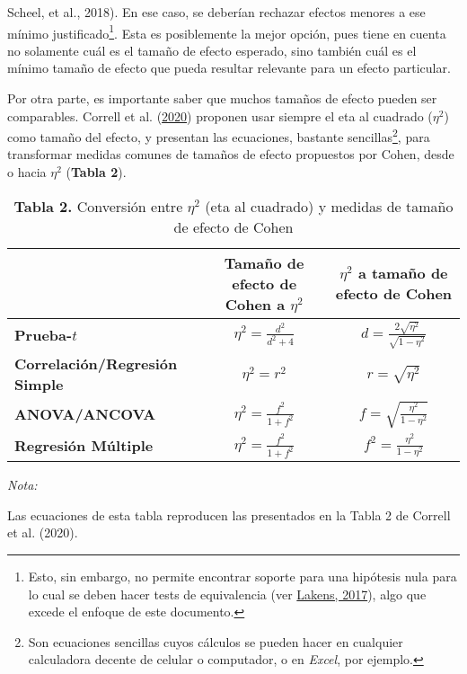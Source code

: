 \documentclass[
]{article}
\begin{document}
\begin{enumerate}
{  Scheel, et al., 2018}). En ese caso, se deberían rechazar efectos
  menores a ese mínimo justificado\footnote{Esto, sin embargo, no
    permite encontrar soporte para una hipótesis nula para lo cual se
    deben hacer tests de equivalencia (ver
    \protect\hyperlink{ref-lakensEquivalenceTestsPractical2017}{Lakens,
    2017}), algo que excede el enfoque de este documento.}.
  \newline \newline Esta es posiblemente la mejor opción, pues tiene en
  cuenta no solamente cuál es el tamaño de efecto esperado, sino también
  cuál es el mínimo tamaño de efecto que pueda resultar relevante para
  un efecto particular.
\end{enumerate}

Por otra parte, es importante saber que muchos tamaños de efecto pueden
ser comparables. Correll et al.
(\protect\hyperlink{ref-correllAvoidCohenSmall2020}{2020}) proponen usar
siempre el eta al cuadrado (\(\eta^2\)) como tamaño del efecto, y
presentan las ecuaciones, bastante sencillas\footnote{Son ecuaciones
  sencillas cuyos cálculos se pueden hacer en cualquier calculadora
  decente de celular o computador, o en \emph{Excel}, por ejemplo.},
para transformar medidas comunes de tamaños de efecto propuestos por
Cohen, desde o hacia \(\eta^2\) (\textbf{Tabla 2}).

\begin{table}[H]

\caption{\label{tab:tab2}\textbf{Tabla 2.} Conversión entre $\eta^2$ (eta al cuadrado) y medidas de tamaño de efecto de Cohen}
\centering
\begin{threeparttable}
\begin{tabular}[t]{>{}lcc}
\toprule
  & \makecell[c]{Tamaño de efecto de \\ Cohen a $\eta^2$} & \makecell[c]{$\eta^2$ a tamaño de \\ efecto de Cohen}\\
\midrule
\textbf{Prueba-$t$} & $\eta^2 = \frac{d^2}{d^2+4}$ & $d = \frac{2\sqrt{\eta^2}}{\sqrt{1-\eta^2}}$\\
\textbf{Correlación/Regresión Simple} & $\eta^2 = r^2$ & $r = \sqrt{\eta^2}$\\
\textbf{ANOVA/ANCOVA} & $\eta^2 = \frac{f^2}{1+f^2}$ & $f = \sqrt{\frac{\eta^2}{1-\eta^2}}$\\
\textbf{Regresión Múltiple} & $\eta^2 = \frac{f^2}{1+f^2}$ & $f^2 = \frac{\eta^2}{1-\eta^2}$\\
\bottomrule
\end{tabular}
\begin{tablenotes}
\item \textit{Nota:} 
\item Las ecuaciones de esta tabla reproducen las presentados en la Tabla 2 de Correll et al. (2020).
\end{tablenotes}
\end{threeparttable}
\end{table}
\end{document}
